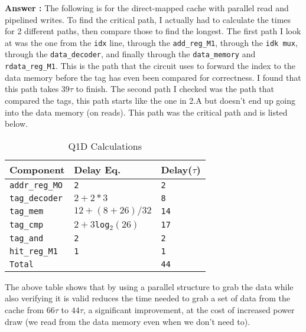 \documentclass[a4paper,11pt]{article}
\newcommand{\answer}{\textbf{Answer : }}
\newcommand{\T}{\texttt}
\newcommand{\V}{\verb}
\begin{document}
\answer The following is for the direct-mapped cache with parallel read and pipelined writes. To find the critical path, I actually had to calculate the times for 2 different paths, then compare those to find the longest. The first path I look at was the one from the \T{idx} line, through the \V.add_reg_M1., through the \V.idk mux., through the \V.data_decoder., and finally through the \V.data_memory. and \V.rdata_reg_M1.. This is the path that the circuit uses to forward the index to the data memory before the tag has even been compared for correctness. I found that this path takes $39\tau$ to finish. The second path I checked was the path that compared the tags, this path starts like the one in 2.A but doesn't end up going into the data memory (on reads). This path was the critical path and is listed below.

\begin{table}[H]
\caption{Q1D Calculations} \label{tab:q2Btable1} 
\begin{center}
\begin{tabular}{| l | l | l |}
\hline
  Component         &  Delay Eq.              & Delay($\tau$)          \\ \hline
  \V.addr_reg_MO.   &   \T{2}                 & \T{2}                  \\ \hline
  \V.tag_decoder.   &   \T{$2+2*3$}           & \T{8}                  \\ \hline
  \V.tag_mem.       &   \T{$12+(8+26)/32$}    & \T{14}                 \\ \hline
  \V.tag_cmp.       &   \T{$2+3$log$_2(26)$}  & \T{17}                 \\ \hline
  \V.tag_and.       &   \T{2}                 & \T{2}                  \\ \hline
  \V.hit_reg_M1.    &   \T{1}                 & \T{1}                  \\ \hline
  \V.Total.         &   \T{}                  & \T{44}                 \\ \hline
\end{tabular}
\end{center}
\end{table}

The above table shows that by using a parallel structure to grab the data while also verifying it is valid reduces the time needed to grab a set of data from the cache from $66\tau$ to $44\tau$, a significant improvement, at the cost of increased power draw (we read from the data memory even when we don't need to).
\end{document}
